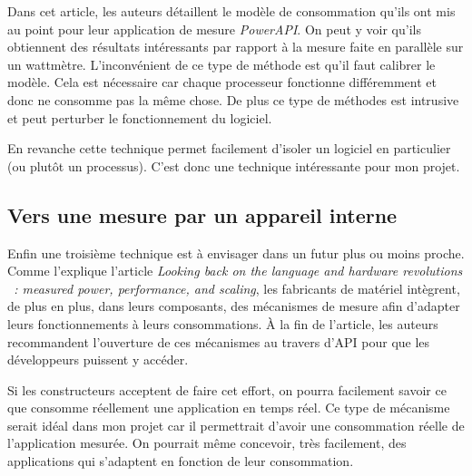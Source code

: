 \documentclass[a4paper, 11pt]{report}
\begin{document}
Dans cet article\cite{noureddine:hal-00681560}, les auteurs détaillent le modèle de consommation qu'ils ont mis au point pour leur application de mesure \textit{PowerAPI}. On peut y voir qu'ils obtiennent des résultats intéressants par rapport à la mesure faite en parallèle sur un wattmètre. L'inconvénient de ce type de méthode est qu'il faut calibrer le modèle. Cela est nécessaire car chaque processeur  fonctionne différemment et donc ne consomme pas la même chose. De plus ce type de méthodes est intrusive et peut perturber le fonctionnement du logiciel.

En revanche cette technique permet facilement d'isoler un logiciel en particulier (ou plutôt un processus). C'est donc une technique intéressante pour mon projet.

			\subsection{Vers une mesure par un appareil interne}
Enfin une troisième technique est à envisager dans un futur plus ou moins proche. Comme l'explique l'article \textit{Looking back on the language and hardware revolutions
~: measured power, performance, and scaling}\cite{Esmaeilzadeh:2011:LBL:1950365.1950402}, les fabricants de matériel intègrent, de plus en plus, dans leurs composants, des mécanismes de mesure afin d'adapter leurs fonctionnements à leurs consommations. À la fin de l'article, les auteurs recommandent l'ouverture de ces mécanismes au travers d'API pour que les développeurs puissent y accéder.

Si les constructeurs acceptent de faire cet effort, on pourra facilement savoir ce que consomme réellement une application en temps réel. Ce type de mécanisme serait idéal dans mon projet car il permettrait d'avoir une consommation réelle de l'application mesurée. On pourrait même concevoir, très facilement, des applications qui s'adaptent en fonction de leur consommation.

\end{document}
